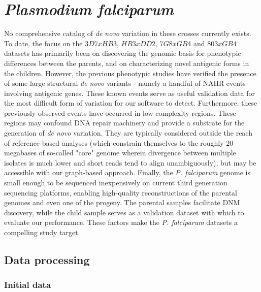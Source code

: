 \chapter{\textit{Plasmodium falciparum}}
\label{ch:pf}

No comprehensive catalog of \textit{de novo} variation in these crosses currently exists.  To date, the focus on the $3D7xHB3$, $HB3xDD2$, $7G8xGB4$ and $803xGB4$ datasets has primarily been on discovering the genomic basis for phenotypic differences between the parents, and on characterizing novel antigenic forms in the children.  However, the previous phenotypic studies have verified the presence of some large structural \textit{de novo} variants - namely a handful of NAHR events involving antigenic genes.  These known events serve as useful validation data for the most difficult form of variation for our software to detect.  Furthermore, these previously observed events have occurred in low-complexity regions.  These regions may confound DNA repair machinery and provide a substrate for the generation of \textit{de novo} variation.  They are typically considered outside the reach of reference-based analyses (which constrain themselves to the roughly $20$ megabases of so-called "core" genome wherein divergence between multiple isolates is much lower and short reads tend to align unambiguously\cite{Miles:2015in}), but may be accessible with our graph-based approach.  Finally, the \textit{P. falciparum} genome is small enough to be sequenced inexpensively on current third generation sequencing platforms, enabling high-quality reconstructions of the parental genomes and even one of the progeny.  The parental samples facilitate DNM discovery, while the child sample serves as a validation dataset with which to evaluate our performance.  These factors make the \textit{P. falciparum} datasets a compelling study target.

\section{Data processing}

\subsection{Initial data}

